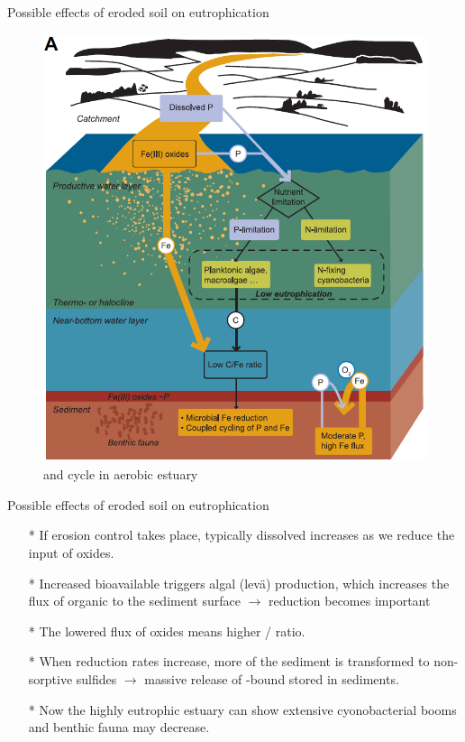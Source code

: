 \documentclass{beamer}
\begin{document}
  
  \begin{frame}{Possible effects of eroded soil on eutrophication}
    \begin{figure}
      \centering
      \includegraphics[scale=0.55]{../Kuvat/eutrophication_A.png}  
      \caption{\footnotesize{ and  cycle in aerobic estuary}}   
    \end{figure}
  \end{frame}
  
  \begin{frame}{Possible effects of eroded soil on eutrophication}
  \begin{itemize}
    \item[*] If erosion control takes place, typically dissolved  increases as we reduce the input of  oxides.
    \item[*] Increased bioavailable  triggers algal (lev{\"a}) production, which increases the flux of organic  to the sediment surface $\rightarrow$  reduction becomes important
    \item[*] The lowered flux of  oxides means higher / ratio.
    \item[*] When  reduction rates increase, more of the sediment  is transformed to non-sorptive  sulfides $\rightarrow$ massive release of -bound  stored in sediments. 
    \item[*] Now the highly eutrophic estuary can show extensive cyonobacterial booms and benthic fauna may decrease.      
  \end{itemize}
  \end{frame}
  
\end{document}
